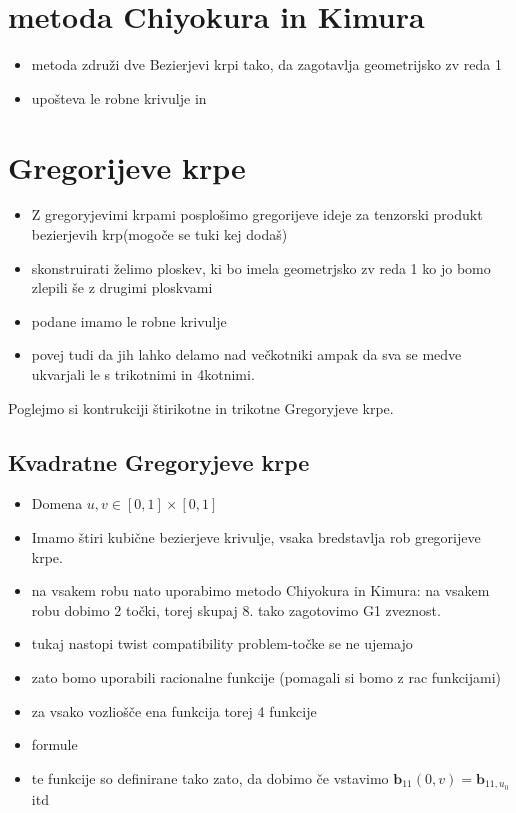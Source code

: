 \documentclass[a4paper,12pt]{article}
\newcommand{\tbf}{\textbf}
\begin{document}
\section{metoda Chiyokura in Kimura}
\begin{itemize}
	\item metoda združi dve Bezierjevi krpi tako, da zagotavlja geometrijsko zv reda 1
	\item upošteva le robne krivulje in	
\end{itemize}
 


\section{Gregorijeve krpe}


\begin{itemize}
	\item Z gregoryjevimi krpami posplošimo gregorijeve ideje za tenzorski produkt bezierjevih krp(mogoče se tuki kej dodaš)
	\item skonstruirati želimo ploskev, ki bo imela geometrjsko zv reda 1 ko jo bomo zlepili še z drugimi ploskvami
	\item podane imamo le robne krivulje
	\item povej tudi da jih lahko delamo nad večkotniki ampak da sva se medve ukvarjali le s trikotnimi in 4kotnimi.
\end{itemize}

Poglejmo si kontrukciji štirikotne in trikotne Gregoryjeve krpe.

\subsection{Kvadratne Gregoryjeve krpe}

\begin{itemize}
	\item  Domena $u,v \in [0,1] \times [0,1]$
	\item Imamo štiri kubične bezierjeve krivulje, vsaka bredstavlja rob gregorijeve krpe.
	\item na vsakem robu nato uporabimo metodo Chiyokura in Kimura: na vsakem robu dobimo 2 točki, torej skupaj $8$. tako zagotovimo G1 zveznost.
	\item tukaj nastopi twist compatibility problem-točke se ne ujemajo
	\item zato bomo uporabili racionalne funkcije (pomagali si bomo z rac funkcijami)
	\item za vsako vozliošče ena funkcija torej 4 funkcije
	\item formule
	\item te funkcije so definirane tako zato, da dobimo če vstavimo $\tbf{b}_{11}(0,v) = \tbf{b}_{11,u_0}$ itd
\end{itemize}
\end{document}
